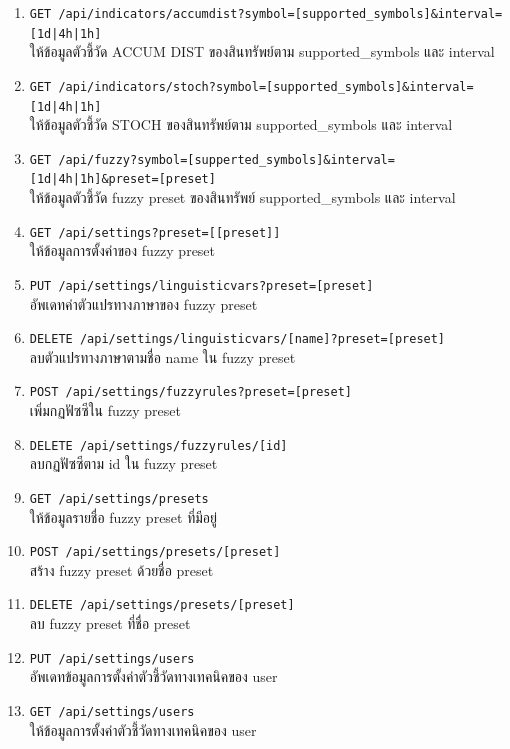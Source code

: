 \begin{enumerate}
    \item \texttt{GET {\footnotesize /api/indicators/accumdist?symbol=[supported\_symbols]\&interval=[1d|4h|1h]}} \\ให้ข้อมูลตัวชี้วัด ACCUM DIST ของสินทรัพย์ตาม supported\_symbols และ interval
    \item \texttt{GET {\footnotesize /api/indicators/stoch?symbol=[supported\_symbols]\&interval=[1d|4h|1h]}} \\ให้ข้อมูลตัวชี้วัด STOCH ของสินทรัพย์ตาม supported\_symbols และ interval
    \item \texttt{GET {\footnotesize /api/fuzzy?symbol=[supperted\_symbols]\&interval=[1d|4h|1h]\&preset=[preset]}} \\ให้ข้อมูลตัวชี้วัด fuzzy preset ของสินทรัพย์ supported\_symbols และ interval
    \item \texttt{GET {\footnotesize /api/settings?preset=[[preset]]}} \\ให้ข้อมูลการตั้งค่าของ fuzzy preset
    \item \texttt{PUT {\footnotesize /api/settings/linguisticvars?preset=[preset]}} \\อัพเดทค่าตัวแปรทางภาษาของ fuzzy preset
    \item \texttt{DELETE {\footnotesize /api/settings/linguisticvars/[name]?preset=[preset]}} \\ลบตัวแปรทางภาษาตามชื่อ name ใน fuzzy preset
    \item \texttt{POST {\footnotesize /api/settings/fuzzyrules?preset=[preset]}} \\เพิ่มกฏฟัซซีใน fuzzy preset
    \item \texttt{DELETE {\footnotesize /api/settings/fuzzyrules/[id]}} \\ลบกฏฟัซซีตาม id ใน fuzzy preset
    \item \texttt{GET {\footnotesize /api/settings/presets}} \\ให้ข้อมูลรายชื่อ fuzzy preset ที่มีอยู่
    \item \texttt{POST {\footnotesize /api/settings/presets/[preset]}} \\สร้าง fuzzy preset ด้วยชื่อ preset
    \item \texttt{DELETE {\footnotesize /api/settings/presets/[preset]}} \\ลบ fuzzy preset ที่ชื่อ preset
    \item \texttt{PUT {\footnotesize /api/settings/users}} \\อัพเดทข้อมูลการตั้งค่าตัวชี้วัดทางเทคนิคของ user
    \item \texttt{GET {\footnotesize /api/settings/users}} \\ให้ข้อมูลการตั้งค่าตัวชี้วัดทางเทคนิคของ user

\end{enumerate}
